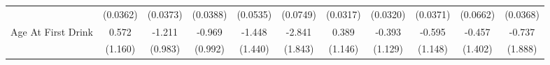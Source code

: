 {\begin{tabular}{l*{10}{c}}
            &    (0.0362)         &    (0.0373)         &    (0.0388)         &    (0.0535)         &    (0.0749)         &    (0.0317)         &    (0.0320)         &    (0.0371)         &    (0.0662)         &    (0.0368)         \\
\addlinespace
Age At First Drink&       0.572         &      -1.211         &      -0.969         &      -1.448         &      -2.841         &       0.389         &      -0.393         &      -0.595         &      -0.457         &      -0.737         \\
            &     (1.160)         &     (0.983)         &     (0.992)         &     (1.440)         &     (1.843)         &     (1.146)         &     (1.129)         &     (1.148)         &     (1.402)         &     (1.888)         \\
\bottomrule
\end{tabular}
}
